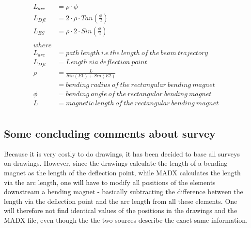 \documentclass{article}
\begin{document}
\begin{align*} 
\begin{split}
 L_{arc} & =\rho \cdot \phi \\
 L_{Dfl} & = 2\cdot \rho \cdot Tan(\frac{\phi}{2})   \\
  L_{ES} & = \rho \cdot 2 \cdot Sin(\frac{\phi}{2})  \\ \\
 where \\
 L_{arc} & = path\ length\ i.e\ the\ length\ of \ the \ beam\ trajectory \\
 L_{Dfl} & = Length\ via\ deflection\ point\ \\
 \rho & = \frac{L}{Sin(E1)+Sin(E2)} \\
  & = bending\ radius\ of\ the\ rectangular\ bending\ magnet \\
  \phi & = bending\ angle\ of\ the\ rectangular\ bending\ magnet \\
 L & = magnetic\  length\ of\ the\ rectangular\ bending\ magnet \\
\end{split}
\end{align*}

\subsection{Some concluding comments about survey}
Because it is very costly to do drawings, it has been decided to base all surveys on drawings. However, since the drawings calculate the length of a bending magnet as the length of the deflection point, while MADX calculates the length via the arc length, one will have to modify all positions of the elements downstream a bending magnet - basically subtracting the difference between the length via the deflection point and the arc length from all these elements. One will therefore not find identical values of the positions in the drawings and the MADX file, even though the the two sources describe the exact same information.
\end{document}
